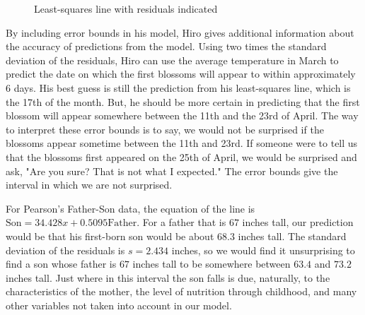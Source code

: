 \documentclass[10pt,]{book}
\theoremstyle{ptxdefinitionnotitle}
\theoremstyle{ptxdefinitiontitle}
\numberwithin{equation}{section}
\begin{document}
\begin{figure}
\begin{sidebyside}{2}{0.05}{0.05}{0.1}
\begin{sbspanel}{0.4}
{{
}
}
\end{sbspanel}
\end{sidebyside}
\caption{Least-squares line with residuals indicated\label{full-cherry-blossom-data-with-errorbounds}}
\end{figure}
\hypertarget{p-134}{}%
By including error bounds in his model, Hiro gives additional information about the accuracy of predictions from the model. Using two times the standard deviation of the residuals, Hiro can use the average temperature in March to predict the date on which the first blossoms will appear to within approximately \(6\) days. His best guess is still the prediction from his least-squares line, which is the 17th of the month. But, he should be more certain in predicting that the first blossom will appear somewhere between the 11th and the 23rd of April. The way to interpret these error bounds is to say, we would not be surprised if the blossoms appear sometime between the 11th and 23rd. If someone were to tell us that the blossoms first appeared on the 25th of April, we would be surprised and ask, "Are you sure?  That is not what I expected." The error bounds give the interval in which we are not surprised.%
\par
\hypertarget{p-135}{}%
For Pearson's Father-Son data, the equation of the line is \(\text{Son} = 34.428x + 0.5095 \text{Father}\). For a father that is \(67\) inches tall, our prediction would be that his first-born son would be about \(68.3\) inches tall. The standard deviation of the residuals is \(s = 2.434\) inches, so we would find it unsurprising to find a son whose father is \(67\) inches tall to be somewhere between \(63.4\) and \(73.2\) inches tall. Just where in this interval the son falls is due, naturally, to the characteristics of the mother, the level of nutrition through childhood, and many other variables not taken into account in our model.%
\end{document}
